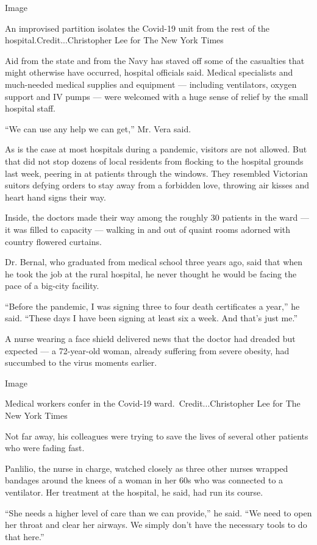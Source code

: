 Image

An improvised partition isolates the Covid-19 unit from the rest of the
hospital.Credit...Christopher Lee for The New York Times

Aid from the state and from the Navy has staved off some of the
casualties that might otherwise have occurred, hospital officials said.
Medical specialists and much-needed medical supplies and equipment ---
including ventilators, oxygen support and IV pumps --- were welcomed
with a huge sense of relief by the small hospital staff.

``We can use any help we can get,'' Mr. Vera said.

As is the case at most hospitals during a pandemic, visitors are not
allowed. But that did not stop dozens of local residents from flocking
to the hospital grounds last week, peering in at patients through the
windows. They resembled Victorian suitors defying orders to stay away
from a forbidden love, throwing air kisses and heart hand signs their
way.

Inside, the doctors made their way among the roughly 30 patients in the
ward --- it was filled to capacity --- walking in and out of quaint
rooms adorned with country flowered curtains.

Dr. Bernal, who graduated from medical school three years ago, said that
when he took the job at the rural hospital, he never thought he would be
facing the pace of a big-city facility.

``Before the pandemic, I was signing three to four death certificates a
year,'' he said. ``These days I have been signing at least six a week.
And that's just me.''

A nurse wearing a face shield delivered news that the doctor had dreaded
but expected --- a 72-year-old woman, already suffering from severe
obesity, had succumbed to the virus moments earlier.

Image

Medical workers confer in the Covid-19 ward.~Credit...Christopher Lee
for The New York Times

Not far away, his colleagues were trying to save the lives of several
other patients who were fading fast.

Panlilio, the nurse in charge, watched closely as three other nurses
wrapped bandages around the knees of a woman in her 60s who was
connected to a ventilator. Her treatment at the hospital, he said, had
run its course.

``She needs a higher level of care than we can provide,'' he said. ``We
need to open her throat and clear her airways. We simply don't have the
necessary tools to do that here.''

